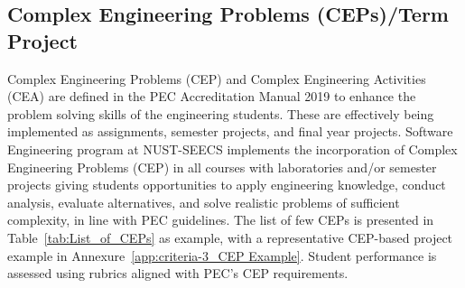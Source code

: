 \hypertarget{sec:4.2cep}{%
\subsection{Complex Engineering Problems (CEPs)/Term Project}\label{sec:4.2cep}}

Complex Engineering Problems (CEP) and Complex Engineering Activities (CEA) are defined in the PEC Accreditation Manual 2019 to enhance the problem solving skills of the engineering students. These are effectively being implemented as assignments, semester projects, and final year projects. Software Engineering program at NUST-SEECS implements the incorporation of Complex Engineering Problems (CEP) in all courses with laboratories and/or semester projects %
giving students opportunities to apply engineering knowledge, conduct analysis, evaluate alternatives, and solve realistic problems of sufficient complexity, in line with PEC guidelines. The list of few CEPs is presented in Table~\ref{tab:List_of_CEPs} as example, with a representative CEP-based project example in Annexure~\ref{app:criteria-3_CEP Example}. Student performance is assessed using rubrics aligned with PEC's CEP requirements.



